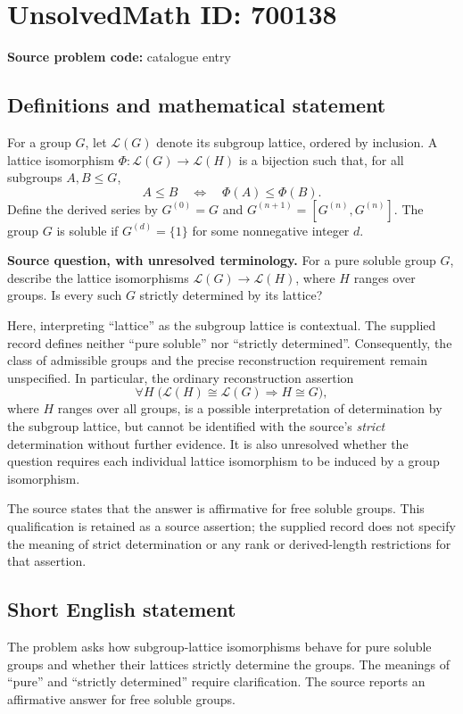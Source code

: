 \documentclass[11pt]{article}
\begin{document}
\section*{UnsolvedMath ID: 700138}
\textbf{Source problem code:} catalogue entry
\subsection{Definitions and mathematical statement}
For a group \(G\), let \(\mathcal L(G)\) denote its subgroup lattice, ordered by inclusion. A lattice isomorphism \(\Phi:\mathcal L(G)\to\mathcal L(H)\) is a bijection such that, for all subgroups \(A,B\leq G\),
\[
A\leq B\quad\Longleftrightarrow\quad\Phi(A)\leq\Phi(B).
\]
Define the derived series by \(G^{(0)}=G\) and \(G^{(n+1)}=[G^{(n)},G^{(n)}]\). The group \(G\) is soluble if \(G^{(d)}=\{1\}\) for some nonnegative integer \(d\).

\textbf{Source question, with unresolved terminology.} For a pure soluble group \(G\), describe the lattice isomorphisms \(\mathcal L(G)\to\mathcal L(H)\), where \(H\) ranges over groups. Is every such \(G\) strictly determined by its lattice?

Here, interpreting ``lattice'' as the subgroup lattice is contextual. The supplied record defines neither ``pure soluble'' nor ``strictly determined''. Consequently, the class of admissible groups and the precise reconstruction requirement remain unspecified. In particular, the ordinary reconstruction assertion
\[
\forall H\;\bigl(\mathcal L(H)\cong\mathcal L(G)\Longrightarrow H\cong G\bigr),
\]
where \(H\) ranges over all groups, is a possible interpretation of determination by the subgroup lattice, but cannot be identified with the source's \emph{strict} determination without further evidence. It is also unresolved whether the question requires each individual lattice isomorphism to be induced by a group isomorphism.

The source states that the answer is affirmative for free soluble groups. This qualification is retained as a source assertion; the supplied record does not specify the meaning of strict determination or any rank or derived-length restrictions for that assertion.
\subsection{Short English statement}
The problem asks how subgroup-lattice isomorphisms behave for pure soluble groups and whether their lattices strictly determine the groups. The meanings of ``pure'' and ``strictly determined'' require clarification. The source reports an affirmative answer for free soluble groups.
\end{document}
